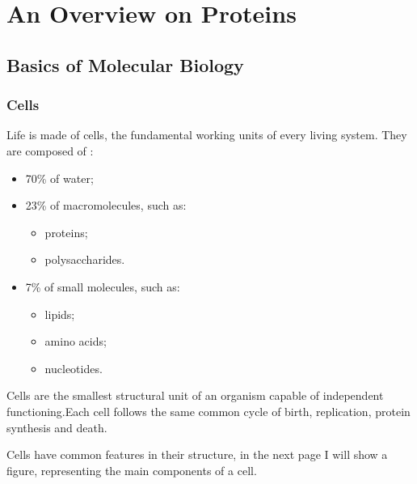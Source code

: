 \chapter{An Overview on Proteins}
\label{chp:proteins}

\section{Basics of Molecular Biology}
\subsection{Cells}
Life is made of cells, the fundamental working units of every living system. They are composed of :
\begin{itemize}
	\item 70\% of water;
	\item 23\% of macromolecules, such as:
	\begin{itemize}
		\item proteins;
		\item polysaccharides.
	\end{itemize}
	
	\item 7\% of small molecules, such as:
	\begin{itemize}
		\item lipids;
		\item amino acids;
		\item nucleotides.
	\end{itemize}
\end{itemize}
Cells are the smallest structural unit of an organism capable of independent functioning.Each cell follows the same common cycle of birth, replication, protein synthesis and death. 

Cells have common features in their structure, in the next page I will show a figure, representing the main components of a cell.

\pagebreak

